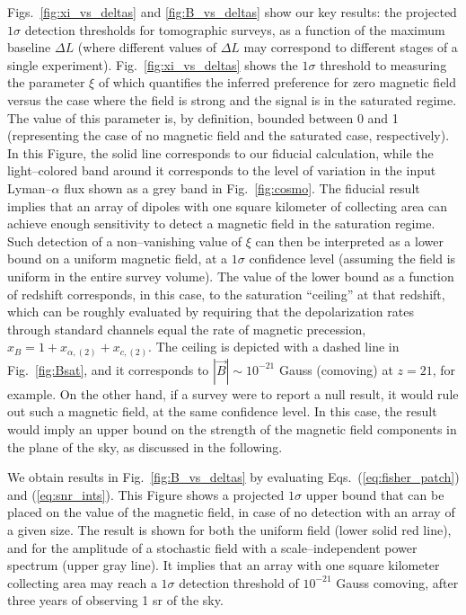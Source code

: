 Figs.~\ref{fig:xi_vs_deltas} and \ref{fig:B_vs_deltas} show our key results: the projected $1\sigma$ detection thresholds for tomographic surveys, as a function of the maximum baseline $\Delta L$ (where different values of $\Delta L$ may correspond to different stages of a single experiment). Fig.~\ref{fig:xi_vs_deltas} shows the $1\sigma$ threshold to measuring the parameter $\xi$ of \eq{\ref{eq:saturated_P}} which quantifies the inferred preference for zero magnetic field versus the case where the field is strong and the signal is in the saturated regime. The value of this parameter is, by definition, bounded between 0 and 1 (representing the case of no magnetic field and the saturated case, respectively). In this Figure, the solid line corresponds to our fiducial calculation, while the light--colored band around it corresponds to the level of variation in the input Lyman--$\alpha$ flux shown as a grey band in Fig.~\ref{fig:cosmo}. The fiducial result implies that an array of dipoles with one square kilometer of collecting area can achieve enough sensitivity to detect a magnetic field in the saturation regime. Such detection of a non--vanishing value of $\xi$ can then be interpreted as a lower bound on a uniform magnetic field, at a $1\sigma$ confidence level (assuming the field is uniform in the entire survey volume). The value of the lower bound as a function of redshift  corresponds, in this case, to the saturation ``ceiling'' at that redshift, which can be roughly evaluated by requiring that the depolarization rates through standard channels equal the rate of magnetic precession, $x_B = 1+x_{\alpha ,(2)} +x_{c,(2)}$. The ceiling is depicted with a dashed line in Fig.~\ref{fig:Bsat}, and it corresponds to $|\vec B|\sim 10^{-21}$ Gauss (comoving) at $z=21$, for example.  On the other hand, if a survey were to report a null result, it would rule out such a magnetic field, at the same confidence level. In this case, the result would imply an upper bound on the strength of the magnetic field components in the plane of the sky, as discussed in the following. 

We obtain results in Fig.~\ref{fig:B_vs_deltas} by evaluating Eqs.~(\ref{eq:fisher_patch}) and (\ref{eq:snr_ints}). This Figure shows a projected $1\sigma$ upper bound that can be placed on the value of the magnetic field, in case of no detection with an array of a given size. The result is shown for both the uniform field (lower solid red line), and for the amplitude of a stochastic field with a scale--independent power spectrum (upper gray line). It implies that an array with one square kilometer collecting area may reach a $1\sigma$ detection threshold of $10^{-21}$ Gauss comoving, after three years of observing 1 sr of the sky. 

